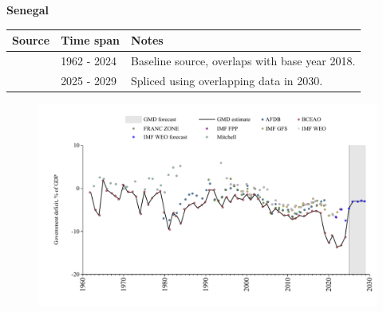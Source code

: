 \documentclass[12pt,a4paper,landscape]{article}
\begin{document}
\begin{adjustbox}{max totalsize={\paperwidth}{\paperheight},center}
\begin{minipage}[t][\textheight][t]{\textwidth}
\vspace*{0.5cm}
{}
\begin{center}
{\Large\bfseries Senegal}
\end{center}
\vspace{0.5cm}
\begin{table}[H]
\centering
\small
\begin{tabular}{|l|l|l|}
\hline
\textbf{Source} & \textbf{Time span} & \textbf{Notes} \\
\hline
\rowcolor{white}\cite{BCEAO}& 1962 - 2024 &Baseline source, overlaps with base year 2018.\\
\rowcolor{lightgray}\cite{IMF_WEO_forecast}& 2025 - 2029 &Spliced using overlapping data in 2030.\\
\hline
\end{tabular}
\end{table}
\begin{figure}[H]
\centering
\includegraphics[width=\textwidth,height=0.6\textheight,keepaspectratio]{graphs/SEN_govdef_GDP.pdf}
\end{figure}
\end{minipage}
\end{adjustbox}
\end{document}
